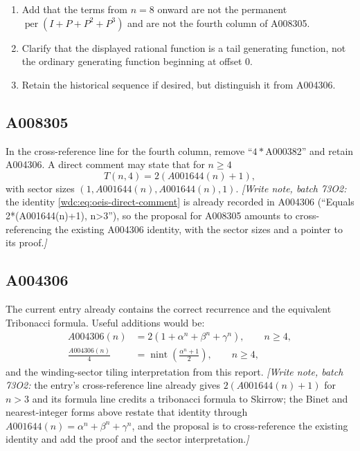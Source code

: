 \documentclass[11pt,letterpaper]{article}
\numberwithin{equation}{section}
\theoremstyle{definition}
\newcommand{\per}{\operatorname{per}}
\begin{document}
\begin{enumerate}[leftmargin=2.2em]
\item Add that the terms from $n=8$ onward are not the permanent
      $\per(I+P+P^2+P^3)$ and are not the fourth column of A008305.
\item Clarify that the displayed rational function is a tail generating
      function, not the ordinary generating function beginning at offset $0$.
\item Retain the historical sequence if desired, but distinguish it from
      A004306.
\end{enumerate}

\subsection{A008305}

In the cross-reference line for the fourth column, remove ``$4*$A000382'' and
retain A004306.  A direct comment may state that for $n\ge4$
\begin{equation}\label{wdc:eq:oeis-direct-comment}
  T(n,4)=2(A001644(n)+1),
\end{equation}
with sector sizes $(1,A001644(n),A001644(n),1)$.
\emph{[Write note, batch 73O2:} the identity \eqref{wdc:eq:oeis-direct-comment}
is already recorded in A004306 (``Equals 2*(A001644(n)+1), n>3''), so the
proposal for A008305 amounts to cross-referencing the existing A004306
identity, with the sector sizes and a pointer to its proof.\emph{]}

\subsection{A004306}

The current entry already contains the correct recurrence and the equivalent
Tribonacci formula.  Useful additions would be:
\begin{align*}
 A004306(n)&=2\left(1+\alpha^n+\beta^n+\gamma^n\right),\qquad n\ge4,\\
 \frac{A004306(n)}4
 &=\operatorname{nint}\left(\frac{\alpha^n+1}{2}\right),\qquad n\ge4,
\end{align*}
and the winding-sector tiling interpretation from this report.
\emph{[Write note, batch 73O2:} the entry's cross-reference line already
gives $2(A001644(n)+1)$ for $n>3$ and its formula line credits a tribonacci
formula to Skirrow; the Binet and nearest-integer forms above restate that
identity through $A001644(n)=\alpha^n+\beta^n+\gamma^n$, and the proposal is
to cross-reference the existing identity and add the proof and the sector
interpretation.\emph{]}
\end{document}
